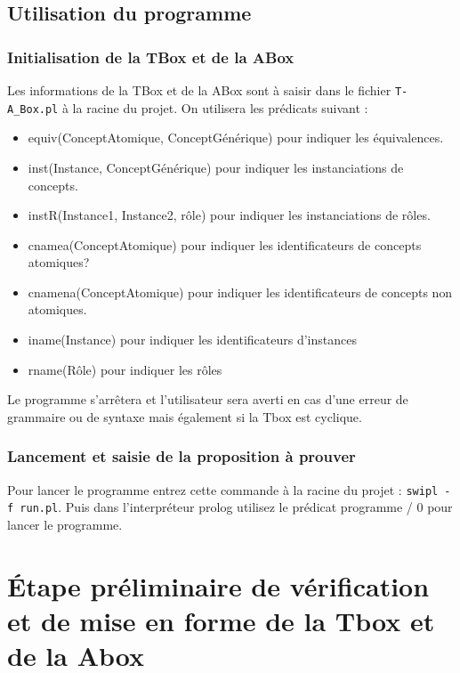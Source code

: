 \documentclass{article}
\begin{document}
\subsection{Utilisation du programme}
\subsubsection{Initialisation de la TBox et de la ABox}
Les informations de la TBox et de la ABox sont à saisir dans le fichier \verb|T-A_Box.pl| à la racine du projet. On utilisera les prédicats suivant : \begin{itemize}
    \item \color{blue} equiv(ConceptAtomique, ConceptGénérique) \color{black} pour indiquer les équivalences.
    \item \color{blue} inst(Instance, ConceptGénérique) \color{black} pour indiquer les instanciations de concepts. 
    \item \color{blue} instR(Instance1, Instance2, rôle) \color{black} pour indiquer les instanciations de rôles.
    \item \color{blue} cnamea(ConceptAtomique) \color{black} pour indiquer les identificateurs de concepts atomiques?
    \item \color{blue} cnamena(ConceptAtomique) \color{black} pour indiquer les identificateurs de concepts non atomiques.
    \item \color{blue} iname(Instance) \color{black} pour indiquer les identificateurs d'instances
    \item \color{blue} rname(Rôle) \color{black} pour indiquer les rôles
\end{itemize}
Le programme s'arrêtera et l'utilisateur sera averti en cas d'une erreur de grammaire ou de syntaxe mais également si la Tbox est cyclique.

\subsubsection{Lancement et saisie de la proposition à prouver}
Pour lancer le programme entrez cette commande à la racine du projet : \verb|swipl -f run.pl|. Puis dans l'interpréteur prolog utilisez le prédicat \color{blue} programme / 0 \color{black} pour lancer le programme.

\section{\'Etape préliminaire de vérification et de mise en forme de la Tbox et de la Abox}
\end{document}

